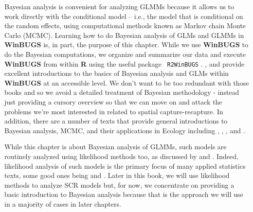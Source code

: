 Bayesian analysis is convenient for analyzing GLMMs because it allows
us to work directly with the conditional model -- i.e., the model that
is conditional on the random effects, using computational methods
known as Markov chain Monte Carlo (MCMC). Learning how to do Bayesian
analysis of GLMs and GLMMs in {\bf WinBUGS} is, in part, the purpose
of this chapter.  While we use {\bf WinBUGS} to do the Bayesian
computations, we organize and summarize our data and execute {\bf
  WinBUGS} from within {\bf R} using the useful package \mbox{\tt
  R2WinBUGS} \citep{sturtz_etal:2005}.  \citet{kery:2010}, and
\citet{kery_schaub:2011} provide excellent introductions to the basics
of Bayesian analysis and GLMs within {\bf WinBUGS} at an accessible level. 
We don't want to
be too redundant with those books and so we avoid a detailed
treatment of Bayesian methodology - instead just providing a cursory
overview so that we can move on and attack the problems we're most
interested in related to spatial capture-recapture.  In addition,
there are a number of texts that provide general introductions to
Bayesian analysis, MCMC, and their applications in Ecology including
\citet{mccarthy:2007}, \citet{kery:2010}, \citet{link_barker:2009}, and
\citet{king_etal:2009}.


While this chapter is about Bayesian analysis of GLMMs, such models
are routinely analyzed using likelihood methods too, as discussed by
\citet{royle_dorazio:2008} and \citet{kery:2010}. 
Indeed, likelihood
analysis of such models is the primary focus of many applied
statistics texts, some good ones being \citet{mccullagh_nelder:1989} and \citet{zuur_etal:2009}. Later in
this book, we will use likelihood methods to analyze SCR models but,
for now, we concentrate on providing a basic introduction to Bayesian
analysis because that is the approach we will use in a majority of
cases in later chapters.




